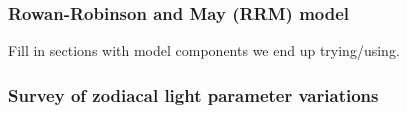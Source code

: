 \documentclass{aa}
\begin{document}
\subsubsection{Rowan-Robinson and May (RRM) model}
Fill in sections with model components we end up trying/using.




\subsubsection{Survey of zodiacal light parameter variations}
\end{document}
